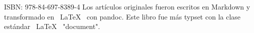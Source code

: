 \mbox{}
\vfill
ISBN: 978-84-697-8389-4
Los artículos originales fueron escritos en Markdown
y transformado en \ LaTeX \ con pandoc.
Este libro fue más typset con la clase estándar \ LaTeX \ "document".
\doclicenseThis
